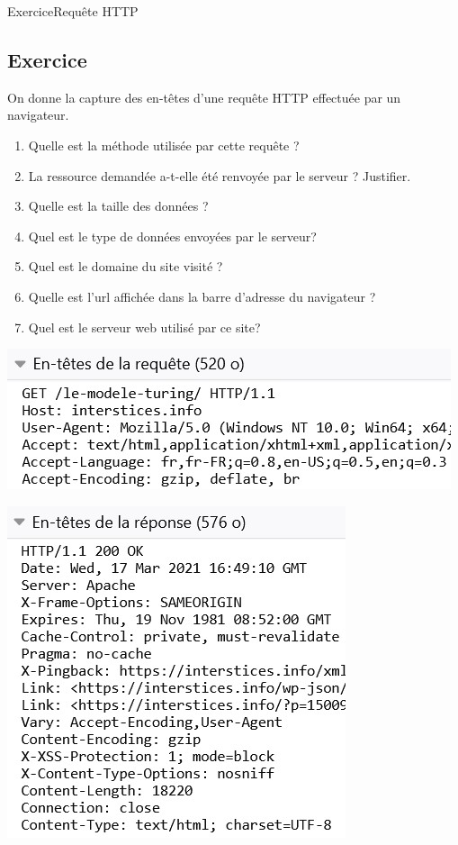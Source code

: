 \documentclass[11pt,a4paper]{article}
\newcounter{numexo}
\begin{document}
\begin{NSI}
{Exercice}{Requête HTTP}
\end{NSI}

\addtocounter{numexo}{1}
\subsection*{\Large Exercice \thenumexo}

\begin{minipage}{9cm}
On donne la capture des en-têtes d'une requête HTTP effectuée par un navigateur.


\begin{enumerate}
\item Quelle est la méthode utilisée par cette requête ?
\item La ressource demandée a-t-elle été renvoyée par le serveur ? Justifier.
\item Quelle est la taille des données ?
\item Quel est le type de données envoyées par le serveur?
\item Quel est le domaine du site visité ?
\item Quelle est l'url affichée dans la barre d'adresse du navigateur ?
\item Quel est le serveur web utilisé par ce site?
\end{enumerate}
\vspace*{2.4cm}
\end{minipage}\hfill
\begin{minipage}{9cm}
\includegraphics[scale=0.7]{img/req3Ex1.jpg}

\includegraphics[scale=0.7]{img/req4Ex1.jpg}
\end{minipage}
\end{document}
